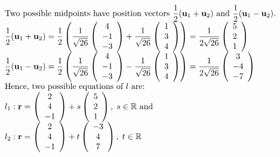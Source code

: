 \documentclass[12pt, a4 paper]{article}
\begin{document}
\begin{outline}[enumerate]
					\[\begin{array}{l}{\textrm{Two possible midpoints have position vectors }}\dfrac{1}{2}({{\bf{u}}_1} + {{\bf{u}}_2}){\textrm{ and }}\dfrac{1}{2}({{\bf{u}}_1} - {{\bf{u}}_2}).\\\dfrac{1}{2}({{\bf{u}}_1} + {{\bf{u}}_2}) = \dfrac{1}{2}\left( {\dfrac{1}{{\sqrt {26} }}\left( {\begin{array}{*{20}{c}}4\\{ - 1}\\{ - 3}\end{array}} \right) + \dfrac{1}{{\sqrt {26} }}\left( {\begin{array}{*{20}{c}}1\\3\\4\end{array}} \right)} \right) = \dfrac{1}{{2\sqrt {26} }}\left( {\begin{array}{*{20}{c}}5\\2\\1\end{array}} \right)\\\dfrac{1}{2}({{\bf{u}}_1} - {{\bf{u}}_2}) = \dfrac{1}{2}\left( {\dfrac{1}{{\sqrt {26} }}\left( {\begin{array}{*{20}{c}}4\\{ - 1}\\{ - 3}\end{array}} \right) - \dfrac{1}{{\sqrt {26} }}\left( {\begin{array}{*{20}{c}}1\\3\\4\end{array}} \right)} \right) = \dfrac{1}{{2\sqrt {26} }}\left( {\begin{array}{*{20}{c}}3\\{ - 4}\\{ - 7}\end{array}} \right)\\{\textrm{Hence, two possible equations of }}l{\textrm{ are:}}\\{l_1}:{\bf{r}} = \left( {\begin{array}{*{20}{c}}2\\4\\{ - 1}\end{array}} \right) + s\left( {\begin{array}{*{20}{c}}5\\2\\1\end{array}} \right),\;s \in \mathbb{R}{\textrm{ and}}\\{l_2}:{\bf{r}} = \left( {\begin{array}{*{20}{c}}2\\4\\{ - 1}\end{array}} \right) + t\left( {\begin{array}{*{20}{c}}{ - 3}\\4\\7\end{array}} \right),\;t \in \mathbb{R}\end{array}\]


\end{outline}
\end{document}
